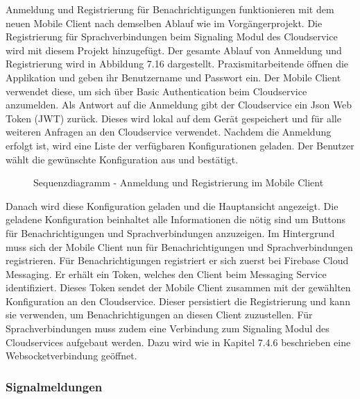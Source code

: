 Anmeldung und Registrierung für Benachrichtigungen funktionieren mit dem neuen Mobile Client nach demselben Ablauf wie im Vorgängerprojekt.
Die Registrierung für Sprachverbindungen beim Signaling Modul des Cloudservice wird mit diesem Projekt hinzugefügt.
Der gesamte Ablauf von Anmeldung und Registrierung wird in Abbildung 7.16 dargestellt.
Praxismitarbeitende öffnen die Applikation und geben ihr Benutzername und Passwort ein.
Der Mobile Client verwendet diese, um sich über Basic Authentication beim Cloudservice anzumelden.
Als Antwort auf die Anmeldung gibt der Cloudservice ein Json Web Token (JWT) zurück.
Dieses wird lokal auf dem Gerät gespeichert und für alle weiteren Anfragen an den Cloudservice verwendet.
Nachdem die Anmeldung erfolgt ist, wird eine Liste der verfügbaren Konfigurationen geladen.
Der Benutzer wählt die gewünschte Konfiguration aus und bestätigt.

\begin{figure}[h]
    \centering
    \begin{minipage}[b]{0.9\textwidth}
        \caption{Sequenzdiagramm - Anmeldung und Registrierung im Mobile Client}
    \end{minipage}
\end{figure}

Danach wird diese Konfiguration geladen und die Hauptansicht angezeigt.
Die geladene Konfiguration beinhaltet alle Informationen die nötig sind um Buttons für Benachrichtigungen und Sprachverbindungen anzuzeigen.
Im Hintergrund muss sich der Mobile Client nun für Benachrichtigungen und Sprachverbindungen registrieren.
Für Benachrichtigungen registriert er sich zuerst bei Firebase Cloud Messaging.
Er erhält ein Token, welches den Client beim Messaging Service identifiziert.
Dieses Token sendet der Mobile Client zusammen mit der gewählten Konfiguration an den Cloudservice.
Dieser persistiert die Registrierung und kann sie verwenden, um Benachrichtigungen an diesen Client zuzustellen.
Für Sprachverbindungen muss zudem eine Verbindung zum Signaling Modul des Cloudservices aufgebaut werden.
Dazu wird wie in Kapitel 7.4.6 beschrieben eine Websocketverbindung geöffnet.

\clearpage

\subsubsection{Signalmeldungen}

